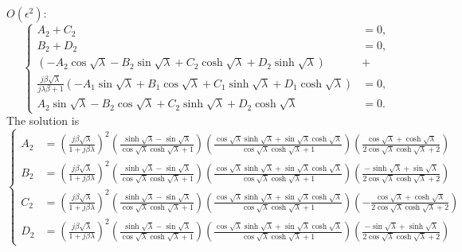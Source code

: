 \documentclass{article}
\begin{document}
\noindent
$O(\epsilon^2)$:
\begin{equation}
    \left\{\begin{aligned}
        A_2 + C_2 &= 0, \\
        B_2 + D_2 &= 0, \\
        \left( - A_2 \cos{\sqrt{\lambda}} - B_2 \sin{\sqrt{\lambda}} + C_2 \cosh{\sqrt{\lambda}} + D_2 \sinh{\sqrt{\lambda}} \right) &+ \\
        \frac{j \beta \sqrt{\lambda}}{ j\lambda \beta + 1 } \left( - A_1 \sin{\sqrt{\lambda}} + B_1 \cos{\sqrt{\lambda}} + C_1 \sinh{\sqrt{\lambda}} + D_1 \cosh{\sqrt{\lambda}} \right) &= 0, \\
        A_2 \sin{\sqrt{\lambda}} - B_2 \cos{\sqrt{\lambda}} + C_2 \sinh{\sqrt{\lambda}} + D_2 \cosh{\sqrt{\lambda}} &= 0.
    \end{aligned}\right.
\end{equation}
The solution is
\scriptsize
\begin{equation}
    \left\{\begin{aligned}
        A_2 &= \left( \frac{j \beta \sqrt{\lambda }}{1+j \beta \lambda } \right)^2 \left(\frac{ \sinh\sqrt{\lambda } - \sin\sqrt{\lambda }}{\cos\sqrt{\lambda } \cosh\sqrt{\lambda }+1} \right) \left( \frac{\cos\sqrt{\lambda } \sinh\sqrt{\lambda }+\sin\sqrt{\lambda } \cosh\sqrt{\lambda }}{\cos\sqrt{\lambda } \cosh\sqrt{\lambda }+1} \right) \left(\frac{\cos\sqrt{\lambda }+\cosh\sqrt{\lambda }}{2 \cos\sqrt{\lambda }\cosh\sqrt{\lambda }+2} \right) \\
        B_2 &= \left( \frac{j \beta \sqrt{\lambda }}{1+j \beta \lambda } \right)^2 \left(\frac{\sinh\sqrt{\lambda } - \sin\sqrt{\lambda }}{\cos\sqrt{\lambda } \cosh\sqrt{\lambda }+1} \right) \left( \frac{\cos\sqrt{\lambda } \sinh\sqrt{\lambda }+\sin\sqrt{\lambda } \cosh\sqrt{\lambda }}{\cos\sqrt{\lambda } \cosh\sqrt{\lambda }+1} \right) \left( \frac{-\sinh\sqrt{\lambda }+\sin\sqrt{\lambda }}{2 \cos\sqrt{\lambda }\cosh\sqrt{\lambda }+2} \right)\\
        C_2 &= \left( \frac{j \beta \sqrt{\lambda }}{1+j \beta \lambda } \right)^2 \left(\frac{\sinh\sqrt{\lambda } - \sin\sqrt{\lambda }}{\cos\sqrt{\lambda } \cosh\sqrt{\lambda }+1} \right) \left( \frac{\cos\sqrt{\lambda } \sinh\sqrt{\lambda }+\sin\sqrt{\lambda } \cosh\sqrt{\lambda }}{\cos\sqrt{\lambda } \cosh\sqrt{\lambda }+1} \right) \left( -\frac{\cos\sqrt{\lambda }+\cosh\sqrt{\lambda }}{2 \cos\sqrt{\lambda } \cosh\sqrt{\lambda }+2} \right)\\
        D_2 &= \left( \frac{j \beta \sqrt{\lambda }}{1+j \beta \lambda } \right)^2 \left(\frac{\sinh\sqrt{\lambda } - \sin\sqrt{\lambda }}{\cos\sqrt{\lambda } \cosh\sqrt{\lambda }+1} \right) \left( \frac{\cos\sqrt{\lambda } \sinh\sqrt{\lambda }+\sin\sqrt{\lambda } \cosh\sqrt{\lambda }}{\cos\sqrt{\lambda } \cosh\sqrt{\lambda }+1} \right) \left( \frac{-\sin\sqrt{\lambda }+\sinh\sqrt{\lambda }}{2 \cos\sqrt{\lambda }\cosh\sqrt{\lambda }+2} \right)
    \end{aligned}\right.
\end{equation}
\normalsize
\end{document}
